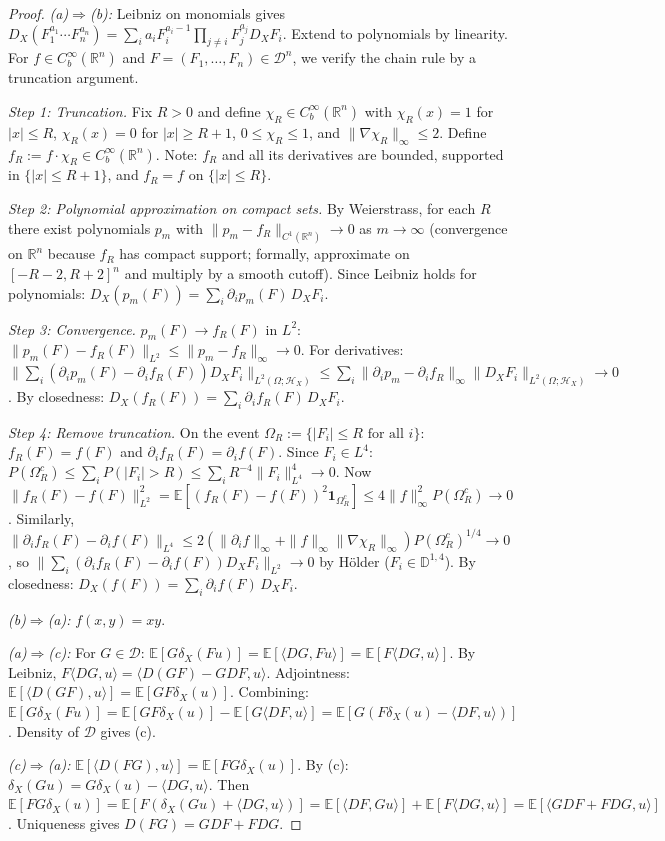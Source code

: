 \documentclass[11pt,a4paper]{article}
\theoremstyle{plain}
\theoremstyle{definition}
\theoremstyle{remark}
\newcommand{\E}{\mathbb{E}}
\newcommand{\R}{\mathbb{R}}
\newcommand{\HX}{\mathcal{H}_X}
\begin{document}
\begin{proof}
\emph{(a)$\Rightarrow$(b):} Leibniz on monomials gives $D_X(F_1^{a_1}\cdots F_n^{a_n}) = \sum_i a_iF_i^{a_i-1}\prod_{j\neq i}F_j^{a_j}D_XF_i$. Extend to polynomials by linearity. For $f \in C_b^\infty(\R^n)$ and $F = (F_1,\ldots,F_n) \in \mathcal{D}^n$, we verify the chain rule by a truncation argument.

\emph{Step 1: Truncation.} Fix $R > 0$ and define $\chi_R \in C_b^\infty(\R^n)$ with $\chi_R(x) = 1$ for $|x| \le R$, $\chi_R(x) = 0$ for $|x| \ge R+1$, $0 \le \chi_R \le 1$, and $\|\nabla\chi_R\|_\infty \le 2$. Define $f_R := f\cdot\chi_R \in C_b^\infty(\R^n)$. Note: $f_R$ and all its derivatives are bounded, supported in $\{|x| \le R+1\}$, and $f_R = f$ on $\{|x| \le R\}$.

\emph{Step 2: Polynomial approximation on compact sets.} By Weierstrass, for each $R$ there exist polynomials $p_m$ with $\|p_m - f_R\|_{C^1(\R^n)} \to 0$ as $m \to \infty$ (convergence on $\R^n$ because $f_R$ has compact support; formally, approximate on $[-R-2,R+2]^n$ and multiply by a smooth cutoff). Since Leibniz holds for polynomials: $D_X(p_m(F)) = \sum_i \partial_i p_m(F)\,D_X F_i$.

\emph{Step 3: Convergence.} $p_m(F) \to f_R(F)$ in $L^2$: $\|p_m(F)-f_R(F)\|_{L^2} \le \|p_m-f_R\|_\infty \to 0$. For derivatives: $\|\sum_i (\partial_ip_m(F)-\partial_if_R(F))D_XF_i\|_{L^2(\Omega;\HX)} \le \sum_i\|\partial_ip_m-\partial_if_R\|_\infty\|D_XF_i\|_{L^2(\Omega;\HX)} \to 0$. By closedness: $D_X(f_R(F)) = \sum_i\partial_if_R(F)\,D_XF_i$.

\emph{Step 4: Remove truncation.} On the event $\Omega_R := \{|F_i| \le R \text{ for all } i\}$: $f_R(F) = f(F)$ and $\partial_if_R(F) = \partial_if(F)$. Since $F_i \in L^4$: $P(\Omega_R^c) \le \sum_i P(|F_i|>R) \le \sum_i R^{-4}\|F_i\|_{L^4}^4 \to 0$. Now $\|f_R(F)-f(F)\|_{L^2}^2 = \E[(f_R(F)-f(F))^2\mathbf{1}_{\Omega_R^c}] \le 4\|f\|_\infty^2 P(\Omega_R^c) \to 0$. Similarly, $\|\partial_if_R(F)-\partial_if(F)\|_{L^4} \le 2(\|\partial_if\|_\infty+\|f\|_\infty\|\nabla\chi_R\|_\infty)P(\Omega_R^c)^{1/4} \to 0$, so $\|\sum_i(\partial_if_R(F)-\partial_if(F))D_XF_i\|_{L^2} \to 0$ by H\"older ($F_i \in \mathbb{D}^{1,4}$). By closedness: $D_X(f(F)) = \sum_i\partial_if(F)\,D_XF_i$.

\emph{(b)$\Rightarrow$(a):} $f(x,y) = xy$.

\emph{(a)$\Rightarrow$(c):} For $G \in \mathcal{D}$: $\E[G\delta_X(Fu)] = \E[\langle DG, Fu\rangle] = \E[F\langle DG,u\rangle]$. By Leibniz, $F\langle DG,u\rangle = \langle D(GF)-GDF, u\rangle$. Adjointness: $\E[\langle D(GF),u\rangle] = \E[GF\delta_X(u)]$. Combining: $\E[G\delta_X(Fu)] = \E[GF\delta_X(u)] - \E[G\langle DF,u\rangle] = \E[G(F\delta_X(u)-\langle DF,u\rangle)]$. Density of $\mathcal{D}$ gives (c).

\emph{(c)$\Rightarrow$(a):} $\E[\langle D(FG),u\rangle] = \E[FG\delta_X(u)]$. By (c): $\delta_X(Gu) = G\delta_X(u)-\langle DG,u\rangle$. Then $\E[FG\delta_X(u)] = \E[F(\delta_X(Gu)+\langle DG,u\rangle)] = \E[\langle DF,Gu\rangle]+\E[F\langle DG,u\rangle] = \E[\langle GDF+FDG,u\rangle]$. Uniqueness gives $D(FG) = GDF+FDG$.
\end{proof}
\end{document}
